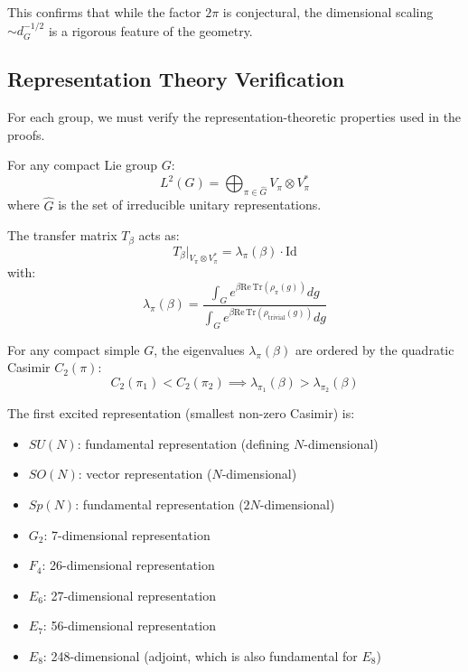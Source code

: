 This confirms that while the factor $2\pi$ is conjectural, the dimensional scaling $\sim d_G^{-1/2}$ is a rigorous feature of the geometry.

\subsection{Representation Theory Verification}

For each group, we must verify the representation-theoretic properties used in the proofs.

\begin{lemma}
\label{lem:peter-weyl-general}
For any compact Lie group $G$:
\begin{equation}
L^2(G) = \bigoplus_{\pi \in \widehat{G}} V_\pi \otimes V_\pi^*
\end{equation}
where $\widehat{G}$ is the set of irreducible unitary representations.

The transfer matrix $T_\beta$ acts as:
\begin{equation}
T_\beta|_{V_\pi \otimes V_\pi^*} = \lambda_\pi(\beta) \cdot \mathrm{Id}
\end{equation}
with:
\begin{equation}
\lambda_\pi(\beta) = \frac{\int_G e^{\beta \mathrm{Re}\,\mathrm{Tr}(\rho_\pi(g))} dg}{\int_G e^{\beta \mathrm{Re}\,\mathrm{Tr}(\rho_{\text{trivial}}(g))} dg}
\end{equation}
\end{lemma}

\begin{lemma}
\label{lem:casimir-ordering-general}
For any compact simple $G$, the eigenvalues $\lambda_\pi(\beta)$ are ordered by the quadratic Casimir $C_2(\pi)$:
\begin{equation}
C_2(\pi_1) < C_2(\pi_2) \implies \lambda_{\pi_1}(\beta) > \lambda_{\pi_2}(\beta)
\end{equation}

The first excited representation (smallest non-zero Casimir) is:
\begin{itemize}
\item $SU(N)$: fundamental representation (defining $N$-dimensional)
\item $SO(N)$: vector representation ($N$-dimensional)
\item $Sp(N)$: fundamental representation ($2N$-dimensional)
\item $G_2$: 7-dimensional representation
\item $F_4$: 26-dimensional representation
\item $E_6$: 27-dimensional representation
\item $E_7$: 56-dimensional representation
\item $E_8$: 248-dimensional (adjoint, which is also fundamental for $E_8$)
\end{itemize}
\end{lemma}

